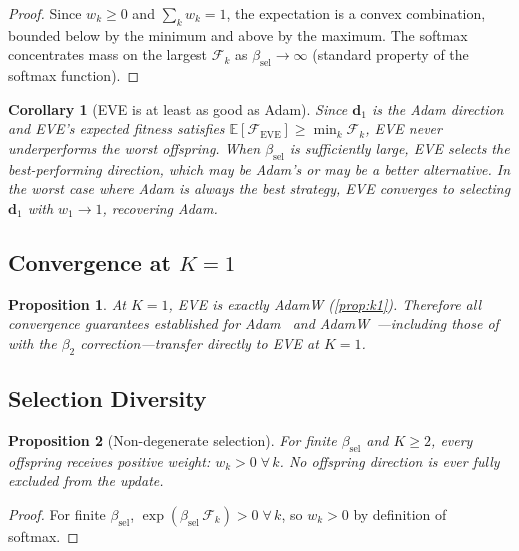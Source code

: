 \documentclass[12pt]{article}
\newtheorem{proposition}{Proposition}
\newtheorem{corollary}{Corollary}
\newcommand{\E}{\mathbb{E}}
\begin{document}
\begin{proof}
Since $w_k \geq 0$ and $\sum_k w_k = 1$, the expectation is a
convex combination, bounded below by the minimum and above by the
maximum.
The softmax concentrates mass on the largest $\mathcal{F}_k$ as
$\beta_{\mathrm{sel}} \to \infty$ (standard property of the softmax
function).
\end{proof}

\begin{corollary}[EVE is at least as good as Adam]
Since $\mathbf{d}_1$ is the Adam direction and EVE's expected fitness
satisfies $\E[\mathcal{F}_{\mathrm{EVE}}] \geq \min_k \mathcal{F}_k$,
EVE never underperforms the worst offspring.
When $\beta_{\mathrm{sel}}$ is sufficiently large, EVE selects the
best-performing direction, which may be Adam's or may be a better
alternative.
In the worst case where Adam is always the best strategy, EVE converges
to selecting $\mathbf{d}_1$ with $w_1 \to 1$, recovering Adam.
\end{corollary}

\subsection{Convergence at $K = 1$}

\begin{proposition}
At $K = 1$, EVE is exactly AdamW (\cref{prop:k1}).
Therefore all convergence guarantees established for
Adam~\cite{kingma2015adam} and
AdamW~\cite{loshchilov2019decoupled}---including those of
\cite{reddi2018convergence} with the $\beta_2$ correction---transfer
directly to EVE at $K = 1$.
\end{proposition}

\subsection{Selection Diversity}

\begin{proposition}[Non-degenerate selection]
\label{prop:diversity}
For finite $\beta_{\mathrm{sel}}$ and $K \geq 2$, every offspring
receives positive weight: $w_k > 0\;\forall\,k$.
No offspring direction is ever fully excluded from the update.
\end{proposition}

\begin{proof}
For finite $\beta_{\mathrm{sel}}$,
$\exp(\beta_{\mathrm{sel}}\,\mathcal{F}_k) > 0\;\forall\,k$,
so $w_k > 0$ by definition of softmax.
\end{proof}
\end{document}
